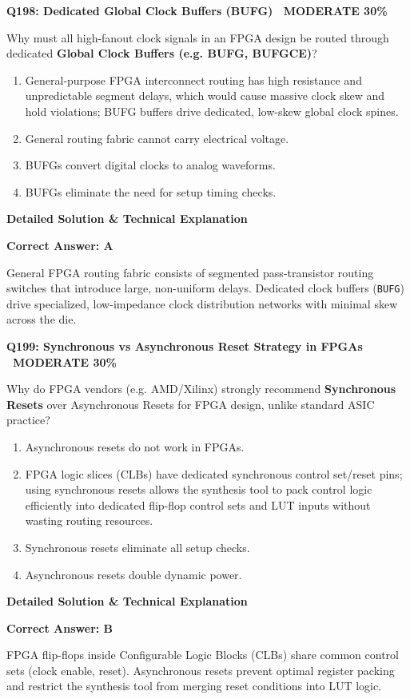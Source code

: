 \documentclass[11pt,a4paper]{article}
\newcommand{\badgemod}{{\color{white}\colorbox{modoran}{\bfseries\sffamily\tiny\ MODERATE 30\%\ }}}
\newenvironment{qbox}[2]{%
  \begin{mdframed}[style=qstyle]%
  {\bfseries\sffamily\color{primaryblue}#1 \hfill #2}\par\vspace{2pt}%
}{%
  \end{mdframed}%
}
\newenvironment{ansbox}{%
  \begin{mdframed}[style=ansstyle]%
  {\bfseries\sffamily\color{ansgreen}\small Detailed Solution \& Technical Explanation}\par\vspace{2pt}\small%
}{%
  \end{mdframed}%
}
\begin{document}
\begin{qbox}{Q198: Dedicated Global Clock Buffers (BUFG)}{\badgemod}
Why must all high-fanout clock signals in an FPGA design be routed through dedicated \textbf{Global Clock Buffers (e.g. BUFG, BUFGCE)}?
\begin{enumerate}[label=\textbf{\Alph*.}]
  \item General-purpose FPGA interconnect routing has high resistance and unpredictable segment delays, which would cause massive clock skew and hold violations; BUFG buffers drive dedicated, low-skew global clock spines.
  \item General routing fabric cannot carry electrical voltage.
  \item BUFGs convert digital clocks to analog waveforms.
  \item BUFGs eliminate the need for setup timing checks.
\end{enumerate}
\end{qbox}
\begin{ansbox}
\textbf{Correct Answer: A}

General FPGA routing fabric consists of segmented pass-transistor routing switches that introduce large, non-uniform delays. Dedicated clock buffers (\texttt{BUFG}) drive specialized, low-impedance clock distribution networks with minimal skew across the die.
\end{ansbox}

\begin{qbox}{Q199: Synchronous vs Asynchronous Reset Strategy in FPGAs}{\badgemod}
Why do FPGA vendors (e.g. AMD/Xilinx) strongly recommend \textbf{Synchronous Resets} over Asynchronous Resets for FPGA design, unlike standard ASIC practice?
\begin{enumerate}[label=\textbf{\Alph*.}]
  \item Asynchronous resets do not work in FPGAs.
  \item FPGA logic slices (CLBs) have dedicated synchronous control set/reset pins; using synchronous resets allows the synthesis tool to pack control logic efficiently into dedicated flip-flop control sets and LUT inputs without wasting routing resources.
  \item Synchronous resets eliminate all setup checks.
  \item Asynchronous resets double dynamic power.
\end{enumerate}
\end{qbox}
\begin{ansbox}
\textbf{Correct Answer: B}

FPGA flip-flops inside Configurable Logic Blocks (CLBs) share common control sets (clock enable, reset). Asynchronous resets prevent optimal register packing and restrict the synthesis tool from merging reset conditions into LUT logic.
\end{ansbox}
\end{document}
